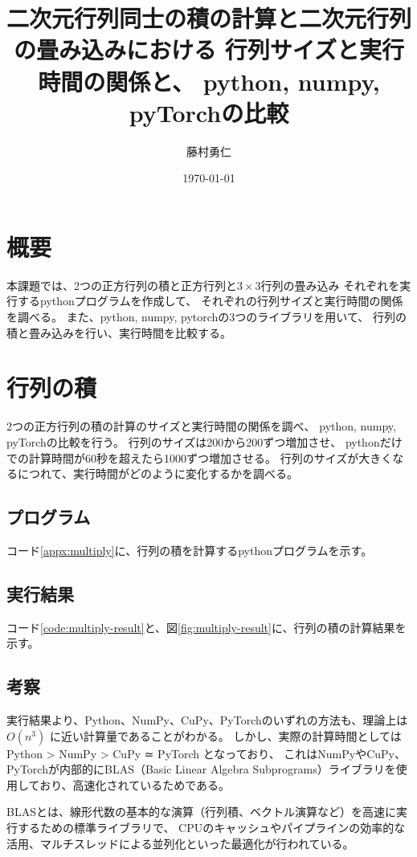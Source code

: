 \documentclass{ltjsarticle}
\title{
    二次元行列同士の積の計算と二次元行列の畳み込みにおける
    行列サイズと実行時間の関係と、
    python, numpy, pyTorchの比較
}
\author{藤村勇仁}
\date{\today}
\begin{document}


\TableOfContents
\section{概要}
    本課題では、2つの正方行列の積と正方行列と\(3\times3\)行列の畳み込み
    それぞれを実行するpythonプログラムを作成して、
    それぞれの行列サイズと実行時間の関係を調べる。
    また、python, numpy, pytorchの3つのライブラリを用いて、
    行列の積と畳み込みを行い、実行時間を比較する。

\section{行列の積}
    2つの正方行列の積の計算のサイズと実行時間の関係を調べ、
    python, numpy, pyTorchの比較を行う。
    行列のサイズは200から200ずつ増加させ、
    pythonだけでの計算時間が60秒を超えたら1000ずつ増加させる。
    行列のサイズが大きくなるにつれて、実行時間がどのように変化するかを調べる。

\subsection{プログラム}
    コード\ref{appx:multiply}に、行列の積を計算するpythonプログラムを示す。

\subsection{実行結果}
    コード\ref{code:multiply-result}と、図\ref{fig:multiply-result}に、行列の積の計算結果を示す。


\subsection{考察}
    実行結果より、Python、NumPy、CuPy、PyTorchのいずれの方法も、理論上は \(O(n^3)\) に近い計算量であることがわかる。
    しかし、実際の計算時間としては Python > NumPy > CuPy ≃ PyTorch となっており、
    これはNumPyやCuPy、PyTorchが内部的にBLAS（Basic Linear Algebra Subprograms）ライブラリを使用しており、高速化されているためである。

    BLASとは、線形代数の基本的な演算（行列積、ベクトル演算など）を高速に実行するための標準ライブラリで、
    CPUのキャッシュやパイプラインの効率的な活用、マルチスレッドによる並列化といった最適化が行われている。
\end{document}
